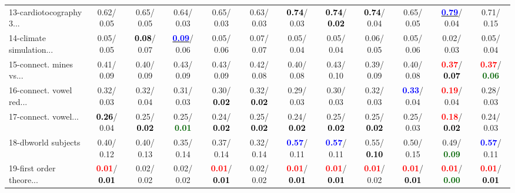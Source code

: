 \begin{table}[h]
\begin{center}
{\begin{tabular}{lc|c|c|c|c|c|c|c|c|c|c}
13-cardiotocography 3... &   0.62/  0.05 &   0.65/  0.05 &   0.64/  0.03 &   0.65/  0.03 &   0.63/  0.03 & \textcolor{black}{\textbf{  0.74}}/  0.03 & \textcolor{black}{\textbf{  0.74}}/\textcolor{black}{\textbf{  0.02}} & \textcolor{black}{\textbf{  0.74}}/  0.04 &   0.65/  0.05 & \underline{\textcolor{blue}{\textbf{  0.79}}}/  0.04 &   0.71/  0.15 \\
14-climate simulation... &   0.05/  0.05 & \textcolor{black}{\textbf{  0.08}}/  0.07 & \underline{\textcolor{blue}{\textbf{  0.09}}}/  0.06 &   0.05/  0.06 &   0.07/  0.07 &   0.05/  0.04 &   0.05/  0.04 &   0.06/  0.05 &   0.05/  0.06 &   0.02/  0.03 &   0.05/  0.04 \\ \hline
15-connect. mines vs... &   0.41/  0.09 &   0.40/  0.09 &   0.43/  0.09 &   0.43/  0.09 &   0.42/  0.08 &   0.40/  0.08 &   0.43/  0.10 &   0.39/  0.09 &   0.40/  0.08 & \textcolor{red}{\textbf{  0.37}}/\textcolor{black}{\textbf{  0.07}} & \textcolor{red}{\textbf{  0.37}}/\textcolor{darkgreen}{\textbf{  0.06}} \\
16-connect. vowel red... &   0.32/  0.03 &   0.32/  0.04 &   0.31/  0.03 &   0.30/\textcolor{black}{\textbf{  0.02}} &   0.32/\textcolor{black}{\textbf{  0.02}} &   0.29/  0.03 &   0.30/  0.03 &   0.32/  0.03 & \textcolor{blue}{\textbf{  0.33}}/  0.04 & \textcolor{red}{\textbf{  0.19}}/  0.04 &   0.28/  0.03 \\
17-connect. vowel... & \textcolor{black}{\textbf{  0.26}}/  0.04 &   0.25/\textcolor{black}{\textbf{  0.02}} &   0.25/\textcolor{darkgreen}{\textbf{  0.01}} &   0.24/\textcolor{black}{\textbf{  0.02}} &   0.25/\textcolor{black}{\textbf{  0.02}} &   0.24/\textcolor{black}{\textbf{  0.02}} &   0.25/\textcolor{black}{\textbf{  0.02}} &   0.25/\textcolor{black}{\textbf{  0.02}} &   0.25/  0.03 & \textcolor{red}{\textbf{  0.18}}/\textcolor{black}{\textbf{  0.02}} &   0.24/  0.03 \\
18-dbworld subjects &   0.40/  0.12 &   0.40/  0.13 &   0.35/  0.14 &   0.37/  0.14 &   0.32/  0.14 & \textcolor{blue}{\textbf{  0.57}}/  0.11 & \textcolor{blue}{\textbf{  0.57}}/  0.11 &   0.55/\textcolor{black}{\textbf{  0.10}} &   0.50/  0.15 &   0.49/\textcolor{darkgreen}{\textbf{  0.09}} & \textcolor{blue}{\textbf{  0.57}}/  0.11 \\
19-first order theore... & \textcolor{red}{\textbf{  0.01}}/\textcolor{black}{\textbf{  0.01}} &   0.02/  0.02 &   0.02/  0.02 & \textcolor{red}{\textbf{  0.01}}/\textcolor{black}{\textbf{  0.01}} &   0.02/  0.02 & \textcolor{red}{\textbf{  0.01}}/\textcolor{black}{\textbf{  0.01}} & \textcolor{red}{\textbf{  0.01}}/\textcolor{black}{\textbf{  0.01}} & \textcolor{red}{\textbf{  0.01}}/  0.02 & \textcolor{red}{\textbf{  0.01}}/\textcolor{black}{\textbf{  0.01}} & \textcolor{red}{\textbf{  0.01}}/\textcolor{darkgreen}{\textbf{  0.00}} & \textcolor{red}{\textbf{  0.01}}/\textcolor{black}{\textbf{  0.01}} \\

\end{tabular}}
\end{center}
\end{table}
